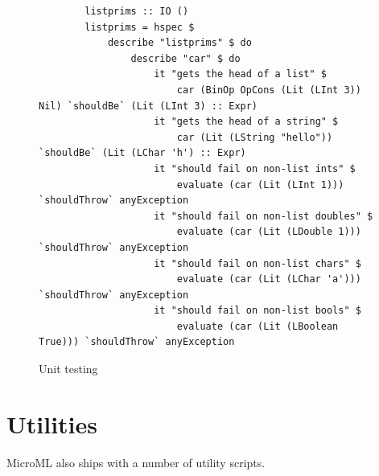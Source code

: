\begin{figure}
    \begin{verbatim}
        listprims :: IO ()
        listprims = hspec $ 
            describe "listprims" $ do
                describe "car" $ do
                    it "gets the head of a list" $ 
                        car (BinOp OpCons (Lit (LInt 3)) Nil) `shouldBe` (Lit (LInt 3) :: Expr)
                    it "gets the head of a string" $
                        car (Lit (LString "hello")) `shouldBe` (Lit (LChar 'h') :: Expr)
                    it "should fail on non-list ints" $ 
                        evaluate (car (Lit (LInt 1)))        `shouldThrow` anyException
                    it "should fail on non-list doubles" $ 
                        evaluate (car (Lit (LDouble 1)))     `shouldThrow` anyException
                    it "should fail on non-list chars" $ 
                        evaluate (car (Lit (LChar 'a')))     `shouldThrow` anyException
                    it "should fail on non-list bools" $ 
                        evaluate (car (Lit (LBoolean True))) `shouldThrow` anyException
    \end{verbatim}
    \caption{Unit testing}
\label{fig:unit}
\end{figure}


\section{Utilities}
MicroML also ships with a number of utility scripts.

